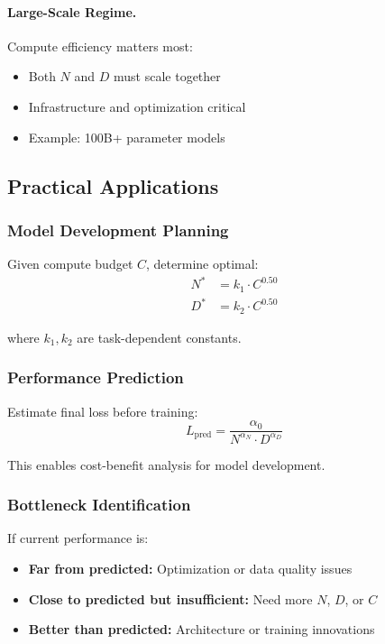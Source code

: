 \documentclass[class=article,crop=false]{standalone}
\begin{document}
\paragraph{Large-Scale Regime.} Compute efficiency matters most:
\begin{itemize}
  \item Both $N$ and $D$ must scale together
  \item Infrastructure and optimization critical
  \item Example: 100B+ parameter models
\end{itemize}

\subsection{Practical Applications}
\label{sec:scaling:applications}

\subsubsection{Model Development Planning}

Given compute budget $C$, determine optimal:
\begin{align}
  N^* &= k_1 \cdot C^{0.50} \\
  D^* &= k_2 \cdot C^{0.50}
\end{align}

where $k_1, k_2$ are task-dependent constants.

\subsubsection{Performance Prediction}

Estimate final loss before training:
\begin{equation}
  L_{\text{pred}} = \frac{\alpha_0}{N^{\alpha_N} \cdot D^{\alpha_D}}
\end{equation}

This enables cost-benefit analysis for model development.

\subsubsection{Bottleneck Identification}

If current performance is:
\begin{itemize}
  \item \textbf{Far from predicted:} Optimization or data quality issues
  \item \textbf{Close to predicted but insufficient:} Need more $N$, $D$, or $C$
  \item \textbf{Better than predicted:} Architecture or training innovations
\end{itemize}
\end{document}
